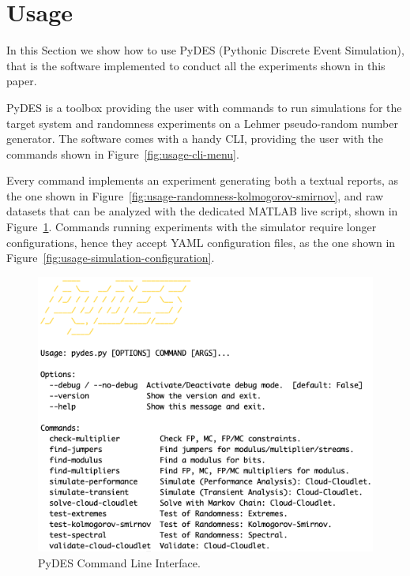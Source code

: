 \section{Usage}
\label{sec:usage}

In this Section we show how to use PyDES (Pythonic Discrete Event Simulation), that is the software implemented to conduct all the experiments shown in this paper.

PyDES is a toolbox providing the user with commands to run simulations for the target system and randomness experiments on a Lehmer pseudo-random number generator.
The software comes with a handy CLI, providing the user with the commands shown in Figure~\ref{fig:usage-cli-menu}. 

Every command implements an experiment generating both a textual reports, as the one shown in Figure~\ref{fig:usage-randomness-kolmogorov-smirnov}, and raw datasets that can be analyzed with the dedicated MATLAB live script, shown in Figure~\ref{fig:usage-matlab-live-script}. 
Commands running experiments with the simulator require longer configurations, hence they accept YAML configuration files, as the one shown in Figure~\ref{fig:usage-simulation-configuration}.

\begin{figure}
	\includegraphics[width=\columnwidth]{fig/usage-pydes-cli}
	\caption{PyDES Command Line Interface.}
	\label{fig:usage-matlab-live-script}
\end{figure}

